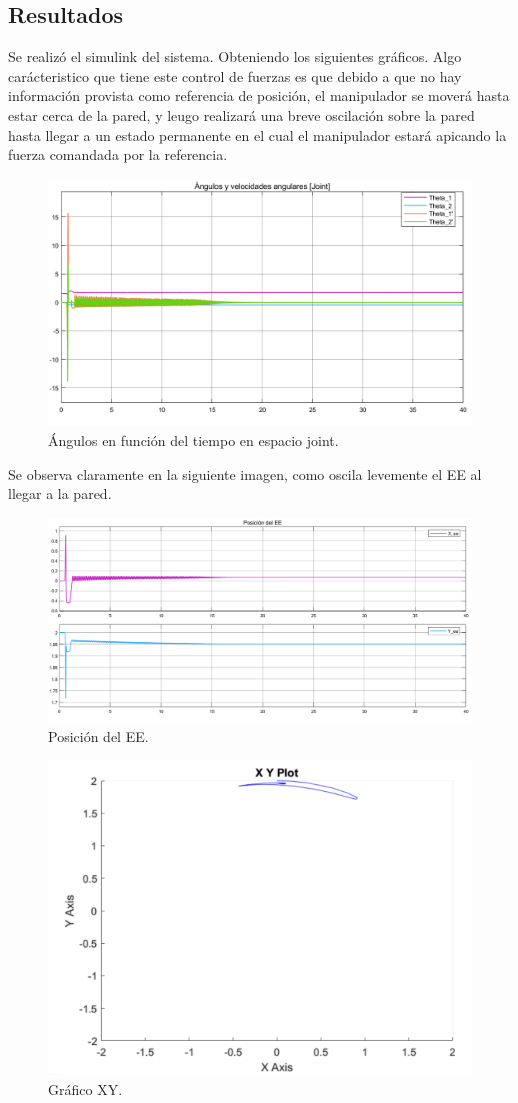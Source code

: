 \subsection{Resultados}
Se realiz\'o el simulink del sistema. Obteniendo los siguientes gr\'aficos.
Algo carácteristico que tiene este control de fuerzas es que debido a que no hay información provista como referencia de posición, el manipulador se moverá hasta estar cerca de la pared, y leugo realizará una breve oscilación sobre la pared hasta llegar a un estado permanente en el cual el manipulador estará apicando la fuerza comandada por la referencia.
\begin{figure}[H]
	\centering
	\includegraphics[width=0.8\linewidth]{ImagenesControl de fuerza no lineal/2_3_a}
	\caption{\'Angulos en funci\'on del tiempo en espacio joint.}	
	\label{fig:athetas}
\end{figure}
Se observa claramente en la siguiente imagen, como oscila levemente el EE al llegar a la pared.
\begin{figure}[H]
	\centering
	\includegraphics[width=0.8\linewidth]{ImagenesControl de fuerza no lineal/2_3_b}
	\caption{Posici\'on  del EE.}	
	\label{fig:apos}
\end{figure}
\begin{figure}[H]
	\centering
	\includegraphics[width=0.5\linewidth]{ImagenesControl de fuerza no lineal/2_3_c}
	\caption{Gr\'afico XY.}	
	\label{fig:axy}
\end{figure}
